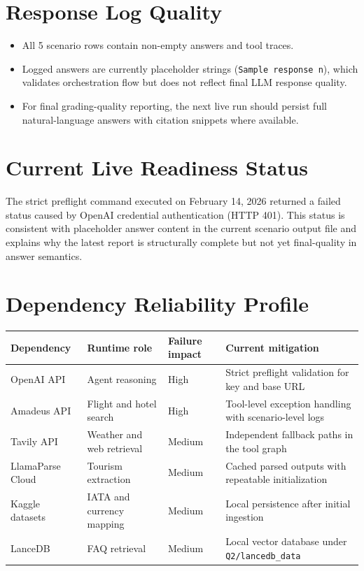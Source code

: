 \documentclass[12pt,a4paper]{article}
\begin{document}
\section{Response Log Quality}
\begin{itemize}
\item All 5 scenario rows contain non-empty answers and tool traces.
\item Logged answers are currently placeholder strings (\texttt{Sample response n}), which validates orchestration flow but does not reflect final LLM response quality.
\item For final grading-quality reporting, the next live run should persist full natural-language answers with citation snippets where available.
\end{itemize}

\section{Current Live Readiness Status}
The strict preflight command executed on February 14, 2026 returned a failed status caused by OpenAI credential authentication (HTTP 401). This status is consistent with placeholder answer content in the current scenario output file and explains why the latest report is structurally complete but not yet final-quality in answer semantics.

\section{Dependency Reliability Profile}
\begin{longtable}{@{}p{} p{} p{} p{}@{}}
\toprule
Dependency & Runtime role & Failure impact & Current mitigation \\
\midrule
OpenAI API & Agent reasoning & High & Strict preflight validation for key and base URL \\
Amadeus API & Flight and hotel search & High & Tool-level exception handling with scenario-level logs \\
Tavily API & Weather and web retrieval & Medium & Independent fallback paths in the tool graph \\
LlamaParse Cloud & Tourism extraction & Medium & Cached parsed outputs with repeatable initialization \\
Kaggle datasets & IATA and currency mapping & Medium & Local persistence after initial ingestion \\
LanceDB & FAQ retrieval & Medium & Local vector database under \texttt{Q2/lancedb\_data} \\
\bottomrule
\end{longtable}
\end{document}
